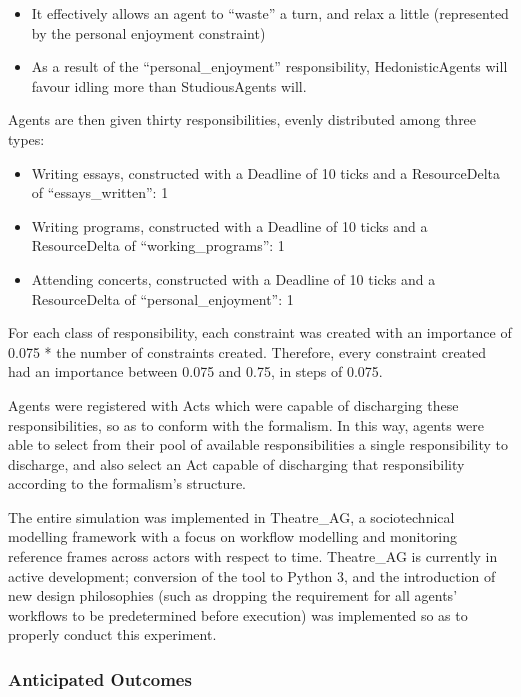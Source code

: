 \begin{itemize}
    \item It effectively allows an agent to ``waste'' a turn, and relax a little (represented by the personal enjoyment constraint)
    \item As a result of the ``personal\_enjoyment'' responsibility, HedonisticAgents will favour idling more than StudiousAgents will.
\end{itemize}

Agents are then given thirty responsibilities, evenly distributed among three types:

\begin{itemize}
    \item Writing essays, constructed with a Deadline of 10 ticks and a ResourceDelta of ``essays\_written'': 1
    \item Writing programs, constructed with a Deadline of 10 ticks and a ResourceDelta of ``working\_programs'': 1
    \item Attending concerts, constructed with a Deadline of 10 ticks and a ResourceDelta of ``personal\_enjoyment'': 1
\end{itemize}

For each class of responsibility, each constraint was created with an importance of 0.075 * the number of constraints created. Therefore, every constraint created had an importance between 0.075 and 0.75, in steps of 0.075.\par

Agents were registered with Acts which were capable of discharging these responsibilities, so as to conform with the formalism. In this way, agents were able to select from their pool of available responsibilities a single responsibility to discharge, and also select an Act capable of discharging that responsibility according to the formalism's structure.\par

The entire simulation was implemented in Theatre\_AG\cite{theatre_code}, a sociotechnical modelling framework with a focus on workflow modelling and monitoring reference frames across actors with respect to time. Theatre\_AG is currently in active development; conversion of the tool to Python 3, and the introduction of new design philosophies (such as dropping the requirement for all agents' workflows to be predetermined before execution) was implemented so as to properly conduct this experiment.\par

\subsubsection{Anticipated Outcomes}

